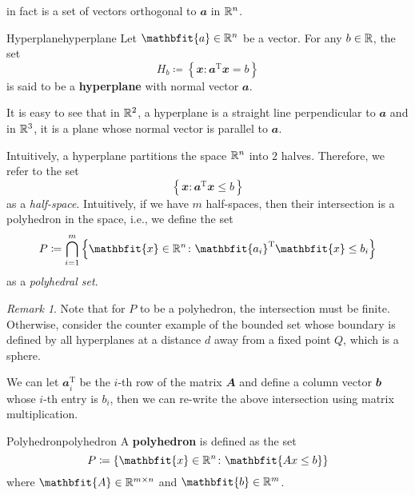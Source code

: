 \documentclass[math, code]{amznotes}
\theoremstyle{remark}
\newtheorem*{remark}{Remark}
\begin{document}
in fact is a set of vectors orthogonal to $\mathbfit{a}$ in $\mathbb{R}^n$.
\begin{dfnbox}{Hyperplane}{hyperplane}
    Let $\mathbfit{a} \in \R^n$ be a vector. For any $b \in \mathbb{R}$, the set 
    \begin{equation*}
        H_b \coloneqq \left\{\mathbfit{x} \colon \mathbfit{a}^{\mathrm{T}}\mathbfit{x} = b\right\}
    \end{equation*}
    is said to be a {\color{red} \textbf{hyperplane}} with normal vector $\mathbfit{a}$.
\end{dfnbox}
It is easy to see that in $\mathbb{R}^2$, a hyperplane is a straight line perpendicular to $\mathbfit{a}$ and in $\mathbb{R}^3$, it is a plane whose normal vector is parallel to $\mathbfit{a}$.

Intuitively, a hyperplane partitions the space $\mathbb{R}^n$ into $2$ halves. Therefore, we refer to the set
\begin{equation*}
    \left\{\mathbfit{x} \colon \mathbfit{a}^{\mathrm{T}}\mathbfit{x} \leq b\right\}
\end{equation*}
as a \textit{half-space}. Intuitively, if we have $m$ half-spaces, then their intersection is a polyhedron in the space, i.e., we define the set
\begin{equation*}
    P \coloneqq \bigcap_{i = 1}^m\left\{\mathbfit{x} \in \R^n \colon \mathbfit{a_i}^{\mathrm{T}}\mathbfit{x} \leq b_i\right\}
\end{equation*}
as a \textit{polyhedral set}.
\begin{notebox}
    \begin{remark}
        Note that for $P$ to be a polyhedron, the intersection must be finite. Otherwise, consider the counter example of the bounded set whose boundary is defined by all hyperplanes at a distance $d$ away from a fixed point $Q$, which is a sphere.
    \end{remark}
\end{notebox}
We can let $\mathbfit{a}_i^{\mathrm{T}}$ be the $i$-th row of the matrix $\mathbfit{A}$ and define a column vector $\mathbfit{b}$ whose $i$-th entry is $b_i$, then we can re-write the above intersection using matrix multiplication.
\begin{dfnbox}{Polyhedron}{polyhedron}
    A {\color{red} \textbf{polyhedron}} is defined as the set
    \begin{equation*}
        P \coloneqq \left\{\mathbfit{x} \in \R^n \colon \mathbfit{Ax \leq b}\right\}
    \end{equation*}
    where $\mathbfit{A} \in \R^{m \times n}$ and $\mathbfit{b} \in \R^m$.
\end{dfnbox}
\end{document}
